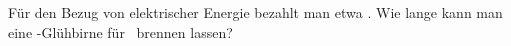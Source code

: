 Für den Bezug von elektrischer Energie bezahlt man etwa \preO. Wie lange kann man eine \PgbO-Glühbirne für \KgbO\ brennen lassen?

